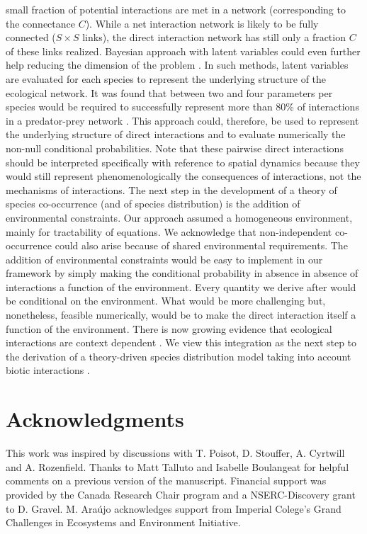 small fraction of potential interactions are met in a network (corresponding
to the connectance $C$). While a net interaction network is likely to be fully
connected ($S\times S$ links), the direct interaction network has still only a
fraction $C$ of these links realized. Bayesian approach with latent variables
could even further help reducing the dimension of the problem \citep[\textit{e.g.}][]{Rohr2010, Ovaskainen2010}. In such methods, latent variables
are evaluated for each species to represent the underlying structure of the
ecological network. It was found that between two and four parameters per
species would be required to successfully represent more than 80\% of interactions
in a predator-prey network \citep{Rohr2010}. This approach could,
therefore, be used to represent the underlying structure of direct interactions
and to evaluate numerically the non-null conditional probabilities. Note that these pairwise direct interactions should be interpreted
specifically with reference to spatial dynamics because they would still
represent phenomenologically the consequences of interactions, not the
mechanisms of interactions.
%
The next step in the development of a theory of species co-occurrence (and of
species distribution) is the addition of environmental constraints. Our
approach assumed a homogeneous environment, mainly for tractability of
equations. We acknowledge that non-independent co-occurrence could also arise
because of  shared environmental requirements. The addition of environmental
constraints would be easy to implement in our framework by simply making the
conditional probability in absence in absence of interactions a function of
the environment. Every quantity we derive after would be conditional on the
environment. What would be more challenging but, nonetheless, feasible
numerically, would be to make the direct interaction itself a function of the
environment. There is now growing evidence that ecological interactions are
context dependent \citep{Chamberlain2014, Poisot2012}. We
view this integration as the next step to the derivation of a theory-driven
species distribution model taking into account biotic interactions \citep{Thuiller2013}.

\section{Acknowledgments}
This work was inspired by discussions with T. Poisot, D. Stouffer, A.
Cyrtwill and A. Rozenfield. Thanks to Matt Talluto and Isabelle Boulangeat for helpful comments on a previous version of the manuscript. Financial support was provided by the Canada Research Chair program
and a NSERC-Discovery grant to D. Gravel. M. Ara\'ujo acknowledges support from Imperial Colege’s Grand Challenges in Ecosystems and Environment Initiative.

